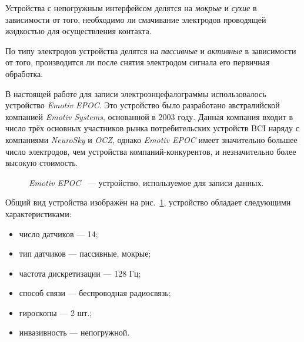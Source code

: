 \documentclass[12pt,fleqn]{article}
\begin{document}
	\par Устройства с непогружным интерфейсом делятся на {\it мокрые} и {\it сухие} в зависимости от того, необходимо ли смачивание электродов проводящей жидкостью для осуществления контакта.
	\par По типу электродов устройства делятся на {\it пассивные} и {\it активные} в зависимости от того, производится ли после снятия электродом сигнала его первичная обработка.

	
	\par В настоящей работе для записи электроэнцефалограммы использовалось устройство {\it Emotiv EPOC}. Это устройство было разработано австралийской компанией {\it Emotiv Systems}, основанной в 2003 году. Данная компания входит в число трёх основных участников рынка потребительских устройств BCI наряду с компаниями {\it NeuroSky} и {\it OCZ}, однако {\it Emotiv EPOC} имеет значительно большее число электродов, чем устройства компаний-конкурентов, и незначительно более высокую стоимость. 
\begin{figure}[h!]
\caption{{\it Emotiv EPOC} ~--- устройство, используемое для записи данных.}
\label{Emotiv}
\end{figure}

	\par Общий вид устройства изображён на рис.~\ref{Emotiv}, устройство обладает следующими характеристиками:
	\begin{itemize}\itemsep0pt
	\item
	число датчиков — 14;
	\item
	тип датчиков — пассивные, мокрые;
	\item
	частота дискретизации — 128 Гц;
	\item
	способ связи — беспроводная радиосвязь;
	\item
	гироскопы — 2 шт.;
	\item
	инвазивность — непогружной.
	\end{itemize}
\end{document}

